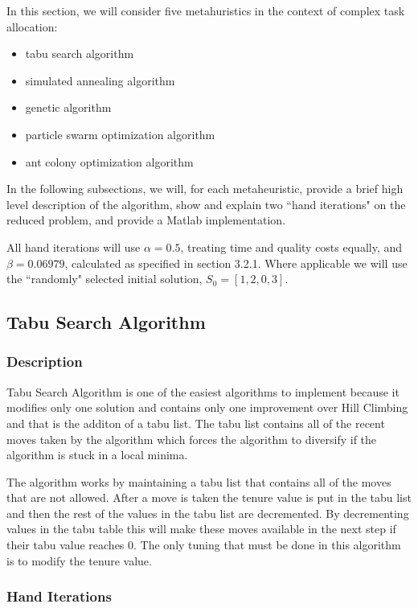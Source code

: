 \documentclass[a4paper]{article}
\begin{document}
In this section, we will consider five metahuristics in the context of complex task allocation:
\begin{itemize}
\item tabu search algorithm
\item simulated annealing algorithm
\item genetic algorithm
\item particle swarm optimization algorithm
\item ant colony optimization algorithm
\end{itemize}

In the following subsections, we will, for each metaheuristic, provide a brief
high level description of the algorithm, show and explain two ``hand iterations"
on the reduced problem, and provide a Matlab implementation.

All hand iterations will use $\alpha = 0.5$, treating time and quality costs
equally, and $\beta = 0.06979$, calculated as specified in section 3.2.1. Where applicable
we will use the ``randomly" selected initial solution, $S_0 = [ 1, 2, 0, 3 ]$.

\subsection{Tabu Search Algorithm} %

\subsubsection{Description} 

Tabu Search Algorithm is one of the easiest algorithms to implement because it modifies only one solution and contains only one improvement over Hill Climbing and that is the additon of a tabu list. The tabu list contains all of the recent moves taken by the algorithm which forces the algorithm to diversify if the algorithm is stuck in a local minima.

The algorithm works by maintaining a tabu list that contains all of the moves that are not allowed. After a move is taken the tenure value is put in the tabu list and then the rest of the values in the tabu list are decremented. By decrementing values in the tabu table this will make these moves available in the next step if their tabu value reaches 0. The only tuning that must be done in this algorithm is to modify the tenure value.

\subsubsection{Hand Iterations}
\end{document}
